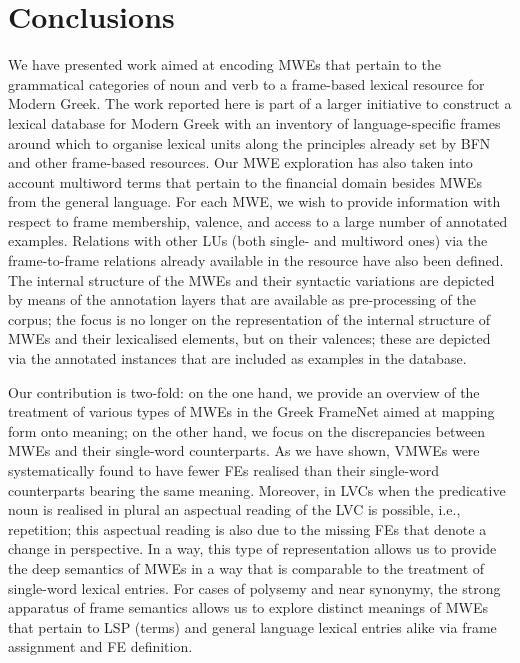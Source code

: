 \documentclass[output=paper,colorlinks,citecolor=brown]{langscibook}
\begin{document}
\section{Conclusions}
\label{sec:conclusions}

We have presented work aimed at encoding MWEs that pertain to the grammatical categories of noun and verb to a frame-based lexical resource for Modern Greek. The work reported here is part of a larger initiative to construct a lexical database for Modern Greek with an inventory of language-specific frames around which to organise lexical units along the principles already set by BFN and other frame-based resources. Our MWE exploration has also taken into account multiword terms that pertain to the financial domain besides MWEs from the general language.
For each MWE, we wish to provide information with respect to frame membership, valence, and access to a large number of annotated examples. Relations with other LUs (both single- and multiword ones) via the frame-to-frame relations already available in the resource have also been defined.  The internal structure of the MWEs and their syntactic variations are depicted by means of the annotation layers that are available as pre-processing of the corpus; the focus is no longer on the representation of the internal structure of MWEs and their lexicalised elements, but on their valences; these are depicted via the annotated instances that are included as examples in the database. 

Our contribution is two-fold: on the one hand, we provide an overview of the treatment of various types of MWEs in the Greek FrameNet aimed at mapping form onto meaning; on the other hand, we focus on the discrepancies between MWEs and their single-word counterparts. As we have shown, VMWEs were systematically found to have fewer FEs realised than their single-word counterparts bearing the same meaning. Moreover, in LVCs when the predicative noun is realised in plural an aspectual reading of the LVC is possible, i.e., repetition; this aspectual reading is also due to the missing FEs that denote a change in perspective. In a way, this type of representation allows us to provide the deep semantics of MWEs in a way that is comparable to the treatment of single-word lexical entries. For cases of polysemy and near synonymy, the strong apparatus of frame semantics allows us to explore distinct meanings of MWEs that pertain to LSP (terms) and general language lexical entries alike via frame assignment and FE definition.
\end{document}
